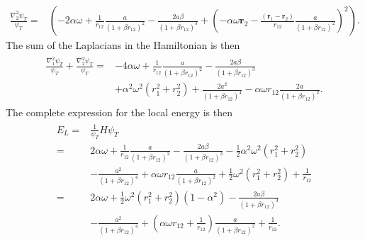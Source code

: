 \documentclass[../main.tex]{subfiles}
\begin{document}
\begin{appendices}
\begin{align}
    \frac{\nabla_2^2\psi_T}{\psi_T} =& \left(-2\alpha\omega + \frac{1}{r_{12}} \frac{a}{(1+\beta r_{12})^2} - \frac{2a\beta}{(1+\beta r_{12})^3} + \left(-\alpha\omega\mathbf{r}_2 - \frac{(\mathbf{r}_1 - \mathbf{r}_2)}{r_{12}} \frac{a}{(1+\beta r_{12})^2}\right)^2\right).
\end{align}
The sum of the Laplacians in the Hamiltonian is then
\begin{align}
\begin{split}
    \frac{\nabla_1^2\psi_T}{\psi_T} + \frac{\nabla_2^2\psi_T}{\psi_T} = &-4\alpha\omega + \frac{1}{r_{12}}\frac{a}{(1+\beta r_{12})^2} - \frac{2a\beta}{(1 + \beta r_12)^3}\\
    &+ \alpha^2\omega^2(r_1^2 + r_2^2) + \frac{2a^2}{(1+\beta r_{12})^4} - \alpha\omega r_{12}\frac{2a}{(1+\beta r_{12})^2}.
\end{split}
\end{align}
The complete expression for the local energy is then 
\begin{align}
\begin{split}
    E_L =& \frac{1}{\psi_T}H\psi_T\\
    =& 2\alpha\omega + \frac{1}{r_{12}}\frac{a}{(1+\beta r_{12})^2} - \frac{2a\beta}{(1 + \beta r_12)^3} - \frac{1}{2}\alpha^2\omega^2(r_1^2 + r_2^2) \\
    &- \frac{a^2}{(1+\beta r_{12})^4} + \alpha\omega r_{12}\frac{a}{(1+\beta r_{12})^2} + \frac{1}{2}\omega^2(r_1^2 + r_2^2) + \frac{1}{r_{12}}\\
    =& 2\alpha\omega + \frac{1}{2}\omega^2(r_1^2 + r_2^2)(1 - \alpha^2) - \frac{2a\beta}{(1 + \beta r_12)^3} \\
    &- \frac{a^2}{(1+\beta r_{12})^4} + \left(\alpha\omega r_{12} + \frac{1}{r_{12}}\right)\frac{a}{(1+\beta r_{12})^2} + \frac{1}{r_{12}}.
\end{split}
\end{align}


\end{appendices}
\end{document}
